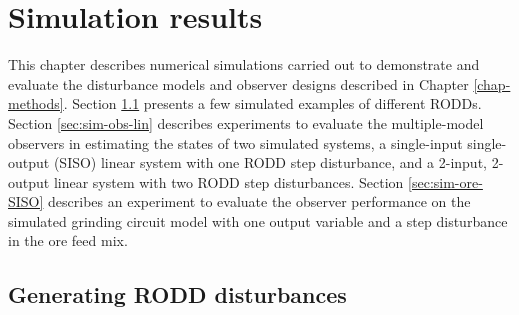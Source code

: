 \chapter{Simulation results}  \label{chap-simulation}
%
This chapter describes numerical simulations carried out to demonstrate and evaluate the disturbance models and observer designs described in Chapter \ref{chap-methods}. Section \ref{sec:sim-RODDs} presents a few simulated examples of different \gls{RODD}s. Section \ref{sec:sim-obs-lin} describes experiments to evaluate the multiple-model observers in estimating the states of two simulated systems, a single-input single-output (SISO) linear system with one \gls{RODD} step disturbance, and a 2-input, 2-output linear system with two \gls{RODD} step disturbances. Section \ref{sec:sim-ore-SISO} describes an experiment to evaluate the observer performance on the simulated grinding circuit model with one output variable and a step disturbance in the ore feed mix. %


\section{Generating RODD disturbances} \label{sec:sim-RODDs}

